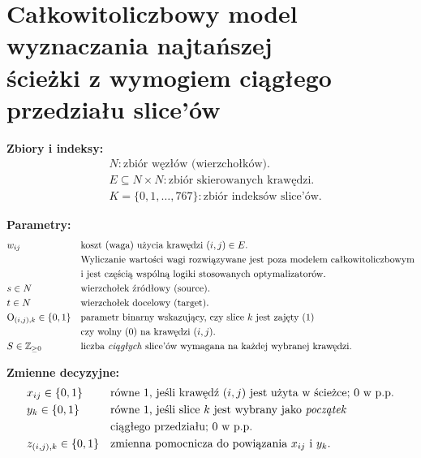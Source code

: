 \documentclass[12pt]{article}
\begin{document}
\section*{Całkowitoliczbowy model wyznaczania najtańszej \\ ścieżki z wymogiem ciągłego przedziału slice'ów}

\noindent \textbf{Zbiory i indeksy:}
\begin{align*}
	 & N: \text{zbiór węzłów (wierzchołków).}                      \\
	 & E \subseteq N \times N: \text{zbiór skierowanych krawędzi.} \\
	 & K = \{0,1,\dots,767\}: \text{zbiór indeksów slice'ów.}
\end{align*}

\vspace{1em}

\noindent \textbf{Parametry:}
\begin{align*}
	& w_{ij}
	& & \text{koszt (waga) użycia krawędzi }(i,j)\in E.\\
	&   & & \text{Wyliczanie wartości wagi rozwiązywane jest poza modelem całkowitoliczbowym} \\
	&   & & \text{i jest częścią wspólną logiki stosowanych optymalizatorów.} \\
	& s \in N
	& & \text{wierzchołek źródłowy (source).} \\
	& t \in N
	& & \text{wierzchołek docelowy (target).} \\
	& \text{O}_{(i,j),k} \in \{0,1\}
	& & \text{parametr binarny wskazujący, czy slice }k \text{ jest zajęty (}1\text{)} \\
	&   & & \text{czy wolny (}0\text{) na krawędzi }(i,j). \\
	& S \in \mathbb{Z}_{\ge 0}
	& & \text{liczba \emph{ciągłych} slice'ów wymagana na każdej wybranej krawędzi.}
\end{align*}

\vspace{1em}

\noindent \textbf{Zmienne decyzyjne:}
\begin{align*}
	 & x_{ij} \in \{0,1\}
	 &                         & \text{równe }1\text{, jeśli krawędź }(i,j)\text{ jest użyta w ścieżce; }0\text{ w p.p.}                                               \\
	 & y_{k} \in \{0,1\}
	 &                         & \text{równe }1\text{, jeśli slice }k \text{ jest wybrany jako \emph{początek} }                                                       \\
	 &                         &                                                                                         & \text{ciągłego przedziału; }0\text{ w p.p.} \\
	 & z_{(i,j),k} \in \{0,1\}
	 &                         & \text{zmienna pomocnicza do powiązania }x_{ij} \text{ i } y_k.
\end{align*}
\end{document}
